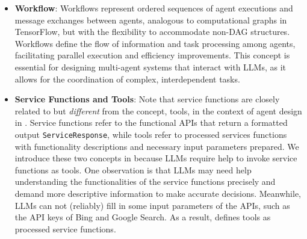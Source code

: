 \begin{itemize}
\begin{lstlisting}[language=Python, caption={Demonstration of message exchange between agents in \ours.}, label={lst:agent}, float=h]
# agent1 and agent2 are two initialized agents, for example
# agent1, agent2 = DialogAgent(...), DialogAgent(...)
msg1 = agent1()
msg2 = agent2(msg1)
\end{lstlisting}


\item \textbf{Workflow}:
Workflows represent ordered sequences of agent executions and message exchanges between agents, analogous to computational graphs in TensorFlow, but with the flexibility to accommodate non-DAG structures. 
Workflows define the flow of information and task processing among agents, facilitating parallel execution and efficiency improvements. 
This concept is essential for designing multi-agent systems that interact with LLMs, as it allows for the coordination of complex, interdependent tasks.


\item \textbf{Service Functions and Tools}: 
Note that service functions are closely related to but \emph{different} from the concept, tools, in the context of agent design in \ours.
Service functions refer to the functional APIs that return a formatted output \texttt{ServiceResponse}, while tools refer to processed services functions with functionality descriptions and necessary input parameters prepared.
We introduce these two concepts in \ours because LLMs require help to invoke service functions as tools.
One observation is that LLMs may need help understanding the functionalities of the service functions precisely and demand more descriptive information to make accurate decisions.
Meanwhile, LLMs can not (reliably) fill in some input parameters of the APIs, such as the API keys of Bing and Google Search.
As a result, \ours defines tools as processed service functions.
\end{itemize}

